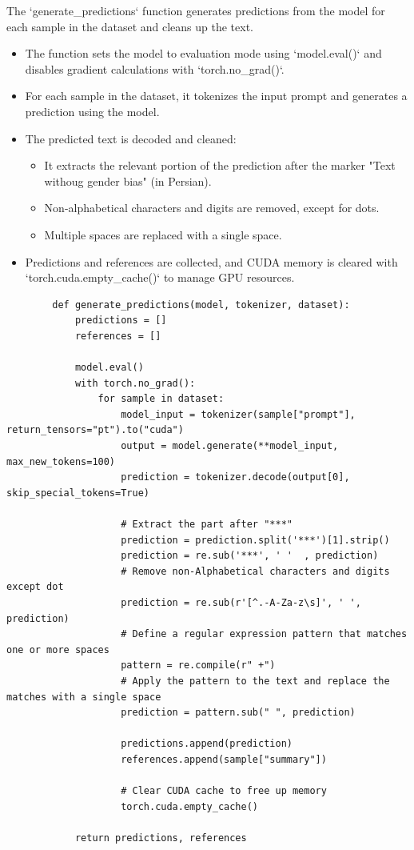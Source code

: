 \documentclass{solutionclass} %
\begin{document}
\begin{solution}
	The `generate\_predictions` function generates predictions from the model for each sample in the dataset and cleans up the text.
	
	\begin{itemize}
		\item The function sets the model to evaluation mode using `model.eval()` and disables gradient calculations with `torch.no\_grad()`.
		\item For each sample in the dataset, it tokenizes the input prompt and generates a prediction using the model.
		\item The predicted text is decoded and cleaned:
		\begin{itemize}
			\item It extracts the relevant portion of the prediction after the marker "Text withoug gender bias" (in Persian).
			\item Non-alphabetical characters and digits are removed, except for dots.
			\item Multiple spaces are replaced with a single space.
		\end{itemize}
		\item Predictions and references are collected, and CUDA memory is cleared with `torch.cuda.empty\_cache()` to manage GPU resources.
	\end{itemize}
	\begin{lstlisting}
		def generate_predictions(model, tokenizer, dataset):
			predictions = []
			references = []
		
			model.eval()
			with torch.no_grad():
				for sample in dataset:
					model_input = tokenizer(sample["prompt"], return_tensors="pt").to("cuda")
					output = model.generate(**model_input, max_new_tokens=100)
					prediction = tokenizer.decode(output[0], skip_special_tokens=True)
					
					# Extract the part after "***"
					prediction = prediction.split('***')[1].strip()
					prediction = re.sub('***', ' '  , prediction)
					# Remove non-Alphabetical characters and digits except dot
					prediction = re.sub(r'[^.-A-Za-z\s]', ' ', prediction)
					# Define a regular expression pattern that matches one or more spaces
					pattern = re.compile(r" +")
					# Apply the pattern to the text and replace the matches with a single space
					prediction = pattern.sub(" ", prediction)
					
					predictions.append(prediction)
					references.append(sample["summary"])
					
					# Clear CUDA cache to free up memory
					torch.cuda.empty_cache()
		
			return predictions, references
		\end{lstlisting}
\end{solution}
\end{document}
